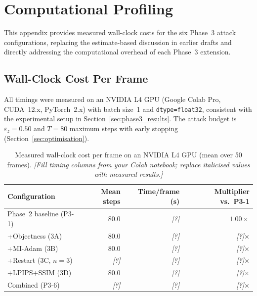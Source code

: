 \documentclass[12pt,a4paper]{report}
\begin{document}
\chapter{Computational Profiling}
\label{app:compute}

This appendix provides measured wall-clock costs for the six Phase~3
attack configurations, replacing the estimate-based discussion in
earlier drafts and directly addressing the computational overhead of
each Phase~3 extension.

\section{Wall-Clock Cost Per Frame}

All timings were measured on an NVIDIA L4 GPU (Google Colab Pro,
CUDA~12.x, PyTorch~2.x) with batch size~1 and
\texttt{dtype=float32}, consistent with the experimental setup in
Section~\ref{sec:phase3_results}.  The attack budget is
$\varepsilon_z = 0.50$ and $T = 80$ maximum steps with early stopping
(Section~\ref{sec:optimisation}).

\begin{table}[htbp]
  \centering
  \caption{Measured wall-clock cost per frame on an NVIDIA L4 GPU
           (mean over 50 frames).
           \textit{[Fill timing columns from your Colab notebook;
           replace italicised values with measured results.]}}
  \label{tab:compute}
  \small
  \begin{tabular}{@{}lrrr@{}}
    \toprule
    Configuration & Mean steps & Time/frame (s) & Multiplier vs.\ P3-1 \\
    \midrule
    Phase~2 baseline (P3-1) & 80.0 & \textit{[?]} & $1.00\times$ \\
    +Objectness  (3A)       & 80.0 & \textit{[?]} & \textit{[?]}$\times$ \\
    +MI-Adam     (3B)       & 80.0 & \textit{[?]} & \textit{[?]}$\times$ \\
    +Restart     (3C, $n{=}3$) & \textit{[?]} & \textit{[?]} & \textit{[?]}$\times$ \\
    +LPIPS+SSIM  (3D)       & 80.0 & \textit{[?]} & \textit{[?]}$\times$ \\
    Combined     (P3-6)     & \textit{[?]} & \textit{[?]} & \textit{[?]}$\times$ \\
    \bottomrule
  \end{tabular}
\end{table}
\end{document}

